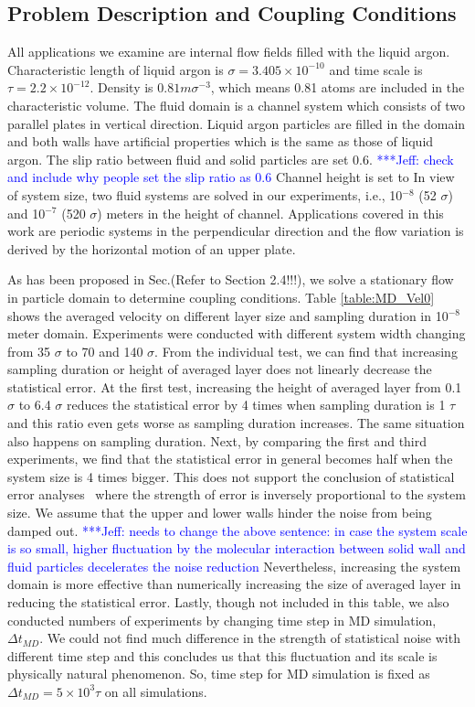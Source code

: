 \documentclass[preprint,12pt]{elsarticle}
\newcommand{\skonote}[1]{ {\textcolor{blue} { ***Jeff: #1 }}}
\newcommand{\skonote}[1]{}
\begin{document}
\subsection{Problem Description and Coupling Conditions}
All applications we examine are internal flow fields filled with the liquid argon. Characteristic length of liquid argon is ${\sigma}=3.405{\times}10^{-10}$ and time scale is $\tau=2.2{\times}10^{-12}$. Density is $0.81m{\sigma}^{-3}$, which means 0.81 atoms are included in the characteristic volume.
The fluid domain is a channel system which consists of two parallel plates in vertical direction. Liquid argon particles are filled in the domain and both walls have artificial properties which is the same as those of liquid argon. The slip ratio between fluid and solid particles are set 0.6.\skonote{check and include why people set the slip ratio as 0.6} Channel height is set to In view of system size, two fluid systems are solved in our experiments, i.e., 10$^{-8}$ (52 $\sigma$) and 10$^{-7}$ (520 $\sigma$) meters in the height of channel. Applications covered in this work are periodic systems in the perpendicular direction and the flow variation is derived by the horizontal motion of an upper plate.

As has been proposed in Sec.(Refer to Section 2.4!!!), we solve a stationary flow in particle domain to determine coupling conditions. Table \ref{table:MD_Vel0} shows the averaged velocity on different layer size and sampling duration in 10$^{-8}$ meter domain. Experiments were conducted with different system width changing from 35 $\sigma$ to 70 and 140 $\sigma$. From the individual test, we can find that increasing sampling duration or height of averaged layer does not linearly decrease the statistical error. At the first test, increasing the height of averaged layer from 0.1 $\sigma$ to 6.4 $\sigma$ reduces the statistical error by 4 times when sampling duration is 1 $\tau$ and this ratio even gets worse as sampling duration increases. The same situation also happens on sampling duration. Next, by comparing the first and third experiments, we find that the statistical error in general becomes half when the system size is 4 times bigger. This does not support the conclusion of statistical error analyses~\cite{Hadjicon3,Time_Mechanism} where the strength of error is inversely proportional to the system size. We assume that the upper and lower walls hinder the noise from being damped out.\skonote{needs to change the above sentence: in case the system scale is so small, higher fluctuation by the molecular interaction between solid wall and fluid particles decelerates the noise reduction} Nevertheless, increasing the system domain is more effective than numerically increasing the size of averaged layer in reducing the statistical error. Lastly, though not included in this table, we also conducted numbers of experiments by changing time step in MD simulation, $\Delta t_{MD}$. We could not find much difference in the strength of statistical noise with different time step and this concludes us that this fluctuation and its scale is physically natural phenomenon. So, time step for MD simulation is fixed as $\Delta t_{MD}=5 \times 10^3 \tau$ on all simulations.
\end{document}
